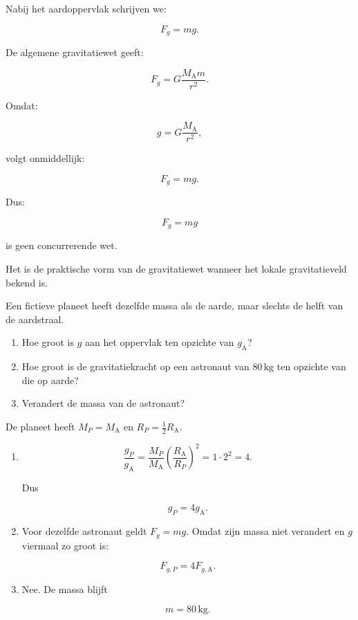 \documentclass{ximera}
\begin{document}


Nabij het aardoppervlak schrijven we:

\[
F_g=mg.
\]

De algemene gravitatiewet geeft:

\[
F_g
=
G\frac{M_\mathrm A m}{r^2}.
\]

Omdat:

\[
g
=
G\frac{M_\mathrm A}{r^2},
\]

volgt onmiddellijk:

\[
F_g=mg.
\]

Dus:

\[
\boxed{
F_g=mg
}
\]

is geen concurrerende wet.

Het is de praktische vorm van de gravitatiewet wanneer het lokale
gravitatieveld bekend is.


\begin{oefening}{\oefU\ESS}

Een fictieve planeet heeft dezelfde massa als de aarde, maar slechts
de helft van de aardstraal.

\begin{enumerate}
  \item Hoe groot is $g$ aan het oppervlak ten opzichte van
        $g_\mathrm A$?
  \item Hoe groot is de gravitatiekracht op een astronaut van
        $80\,\mathrm{kg}$ ten opzichte van die op aarde?
  \item Verandert de massa van de astronaut?
\end{enumerate}


\begin{oplossing}

De planeet heeft $M_P=M_\mathrm A$ en
$R_P=\frac12R_\mathrm A$.

\begin{enumerate}
  \item
  \[
  \frac{g_P}{g_\mathrm A}
  =
  \frac{M_P}{M_\mathrm A}
  \left(\frac{R_\mathrm A}{R_P}\right)^2
  =
  1\cdot2^2=4.
  \]

  Dus

  \[
  \boxed{
  g_P=4g_\mathrm A.
  }
  \]

  \item Voor dezelfde astronaut geldt $F_g=mg$. Omdat zijn massa niet
  verandert en $g$ viermaal zo groot is:

  \[
  \boxed{
  F_{g,P}=4F_{g,\mathrm A}.
  }
  \]

  \item Nee. De massa blijft

  \[
  \boxed{
  m=80\,\mathrm{kg}.
  }
  \]
\end{enumerate}

\end{oplossing}

\end{oefening}
\end{document}
